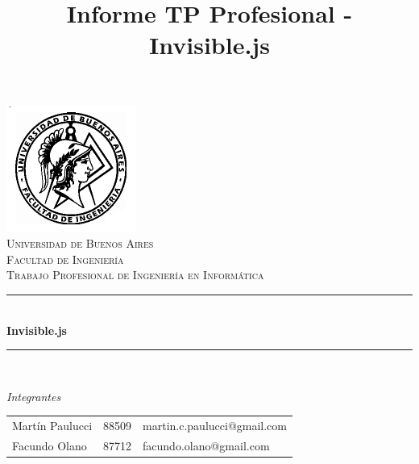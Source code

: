 \documentclass[doc,helv,longtable]{article}
\begin{document}

\pagestyle{fancy}
\renewcommand{\sectionmark}[1]{\markboth{}{\thesection\ \ #1}}
\lhead{}
\chead{}
\rhead{\rightmark}
\lfoot{}
\cfoot{}
\rfoot{\thepage}


\title{Informe TP Profesional - Invisible.js}


\begin{titlepage}

\thispagestyle{empty}

\begin{center}
\includegraphics[scale=0.55]{./fiuba}\\
\textsc{\Large Universidad de Buenos Aires}\\[0.2cm]
\textsc{\Large Facultad de Ingeniería}\\[1.5cm]


\textsc{\large Trabajo Profesional de Ingeniería en Informática} \\[0.3cm]

\rule{\linewidth}{0.5mm} \\[0.4cm]
{\huge \bfseries Invisible.js} \\[0.3cm]
\rule{\linewidth}{0.5mm} \\ [2cm]


\begin{flushleft}
\Large\center\emph{Integrantes} \\[0.2cm]

\begin{tabular}{lll}
Martín Paulucci & 88509 & martin.c.paulucci@gmail.com \\
Facundo Olano & 87712 & facundo.olano@gmail.com \\
\end{tabular}
\end{flushleft}

\end{center}
\end{titlepage}
\end{document}
